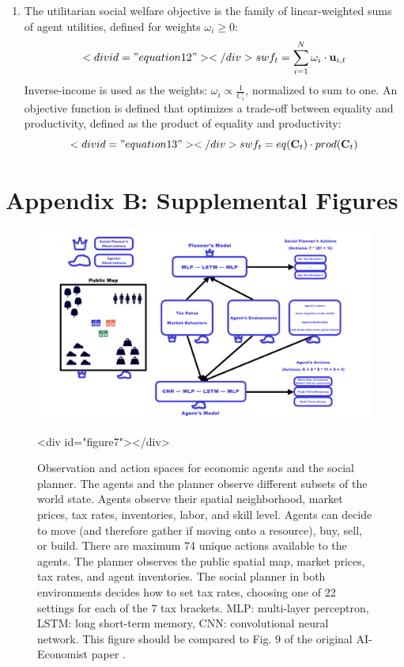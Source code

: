 \documentclass{article}
\begin{document}
\begin{enumerate}
\item The utilitarian social welfare objective is the family of linear-weighted sums of agent utilities, defined for weights \( \omega_{i} \geq 0 \):
\begin{equation}<div id="equation12"></div>

swf_{t} = \sum^{N}_{i = 1} \mathbf{\omega}_{i} \cdot \mathbf{u}_{i, t}
\end{equation}
Inverse-income is used as the weights: \( \omega_{i} \propto \frac{1}{C_{i}} \), normalized to sum to one. An objective function is defined that optimizes a trade-off between equality and productivity, defined as the product of equality and productivity:
\begin{equation}<div id="equation13"></div>

swf_{t} = eq(\mathbf{C}_{t}) \cdot prod(\mathbf{C}_{t})
\end{equation}
\end{enumerate}

\newpage

\section{Appendix B: Supplemental Figures}

\begin{figure}[h!]
\centering
\includegraphics[width=0.7\linewidth]{"A_Multi-agent_Reinforcement_Learning_Study_of_Emergence_of_Social_Classes_out_of_Arbitrary_Governance_The_Role_of_Environment_Slides_1/A_Multi-agent_Reinforcement_Learning_Study_of_Emergence_of_Social_Classes_out_of_Arbitrary_Governance_The_Role_of_Environment_Slides_1.002"}
\caption{Observation and action spaces for economic agents and the social planner. The agents and the planner observe different subsets of the world state. Agents observe their spatial neighborhood, market prices, tax rates, inventories, labor, and skill level. Agents can decide to move (and therefore gather if moving onto a resource), buy, sell, or build. There are maximum 74 unique actions available to the agents. The planner observes the public spatial map, market prices, tax rates, and agent inventories. The social planner in both environments decides how to set tax rates, choosing one of 22 settings for each of the 7 tax brackets. MLP: multi-layer perceptron, LSTM: long short-term memory, CNN: convolutional neural network. This figure should be compared to Fig. 9 of the original AI-Economist paper \citep{Zheng2022}.}
<div id="figure7"></div>

\end{figure}
\end{document}
